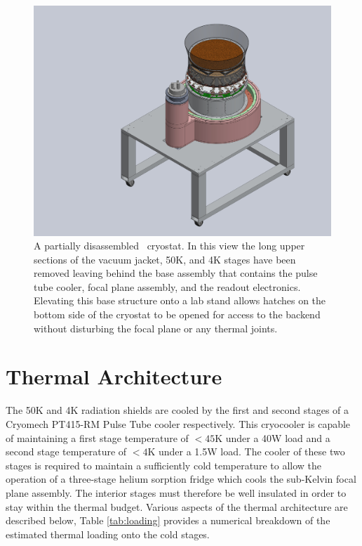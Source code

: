 \documentclass[]{spie}
\begin{document}
\begin{figure} [h]
	\begin{center}
		\includegraphics[scale=0.4]{base_on_lowboy.JPG}
	\end{center}
	\caption{A partially disassembled \biceparray\ cryostat. In this view
	the long upper sections of the vacuum jacket, 50K, and 4K stages have been
	removed leaving behind the base assembly that contains the pulse tube cooler,
	focal plane assembly, and the readout electronics. Elevating this base
	structure onto a lab stand allows hatches on the bottom side of the cryostat to
	be opened for access to the backend without disturbing the focal plane or any
	thermal joints.
	}
	\label{fig:base}
\end{figure}


\section{Thermal Architecture}
\label{sec:thermal_architecture}

 The 50K and 4K radiation shields are cooled by the first
and second stages of a Cryomech\cite{cryomech} PT415-RM Pulse Tube cooler respectively. This
cryocooler is capable of maintaining a first stage temperature of $<45$K under
a 40W load and a second stage temperature of $<4$K under a
1.5W load. The cooler of these two stages is required to maintain a
sufficiently cold temperature to allow the operation of a three-stage helium
sorption fridge which cools the sub-Kelvin focal plane assembly. The interior
stages must therefore be well insulated in order to stay within the thermal
budget. Various aspects of the thermal architecture are described below, Table
\ref{tab:loading} provides a numerical breakdown of the estimated thermal loading onto
the cold stages.
\end{document}
